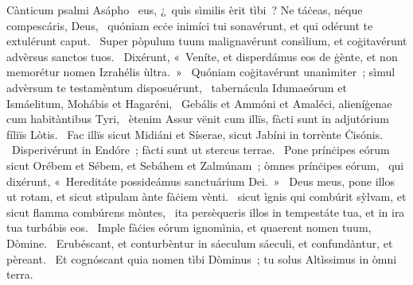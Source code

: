 { Cànticum psalmi Asápho}
{%
~eus, ¿~quìs sìmilis èrit tìbi~? Ne táċeas, néque compescáris, Deus, 
~quóniam ecċe inimíci tui sonavérunt, et qui odérunt te extulérunt caput. 
~Super pòpulum tuum malignavérunt consìlium, et coġitavérunt advèrsus sanctos tuos. 
~Dixérunt, «~Veníte, et disperdámus eos de ġènte, et non memorétur nomen Izrahélis ùltra.~» 
~Quóniam coġitavérunt unanìmiter~; sìmul advèrsum te testamèntum disposuérunt, 
~tabernácula Idumaeórum et Ismáelitum, Mohábis et Hagaréni, 
~Gebális et Ammóni et Amaléci, alieníġenae cum habitàntibus Tyri, 
~ètenim Assur vënit cum illïs, fàcti sunt in adjutórium fíliïs Lòtis. 
~Fac illïs sicut Midiáni et Síserae, sicut Jabíni in torrènte Ċisónis. 
~Disperivérunt in Endóre~; fàcti sunt ut stercus terrae. 
~Pone prínċipes eórum sicut Orébem et Sébem, et Sebáhem et Zalmúnam~; òmnes prínċipes eórum, 
~qui dixérunt, «~Hereditáte possideámus sanctuárium Dei.~»
~Deus meus, pone illos ut rotam, et sicut stìpulam ànte fàċiem vènti. 
~sicut ìgnis qui combúrit sỳlvam, et sicut flamma combúrens mòntes, 
~ita persèqueris illos in tempestáte tua, et in ira tua turbábis eos. 
~Imple fàċies eórum ignomìnia, et quaerent nomen tuum, Dòmine. 
~Erubéscant, et conturbèntur in sáeculum sáeculi, et confundàntur, et pèreant. 
~Et cognóscant quia nomen tìbi Dòminus~; tu solus Altìssimus in òmni terra. 
}
